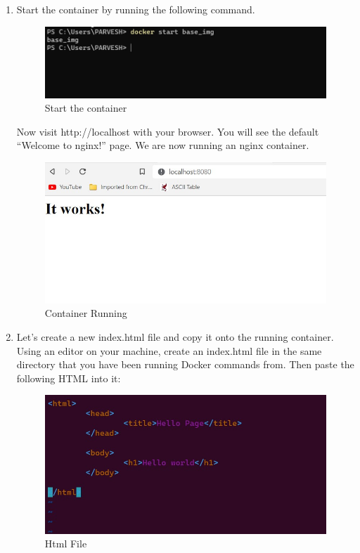 \documentclass[12pt]{article}
\begin{document}
\begin{enumerate}
\item Start the container by running the following command.

\begin{figure}[H]
\centering
\includegraphics[scale=0.7]{fig29}
\caption{Start the container}
\vspace{0.6\baselineskip}
\end{figure}	

Now visit http://localhost with your browser. You will see the default “Welcome to nginx!” page. We are now running an nginx container.

\begin{figure}[H]
\centering
\includegraphics[scale=0.7]{fig30}
\caption{Container Running}
\vspace{0.6\baselineskip}
\end{figure}	

\item Let’s create a new index.html file and copy it onto the running container. Using an editor on your machine, create an index.html file in the same directory that you have been running Docker commands from. Then paste the following HTML into it:

\begin{figure}[H]
\centering
\includegraphics[scale=0.7]{fig31}
\caption{Html File}
\vspace{0.6\baselineskip}
\end{figure}	


\end{enumerate}
\end{document}
